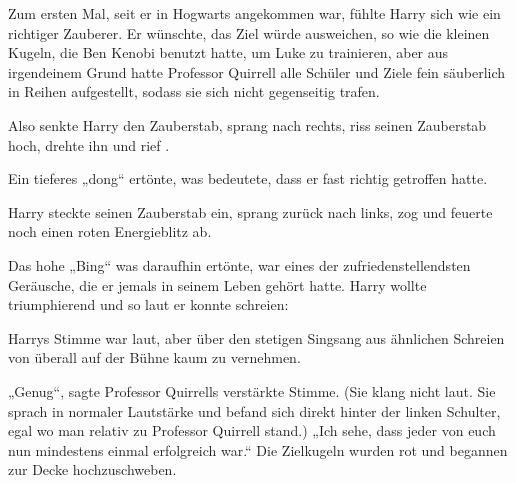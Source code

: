 Zum ersten Mal, seit er in Hogwarts angekommen war, fühlte Harry sich wie ein richtiger Zauberer. Er wünschte, das Ziel würde ausweichen, so wie die kleinen Kugeln, die Ben Kenobi benutzt hatte, um Luke zu trainieren, aber aus irgendeinem Grund hatte Professor Quirrell alle Schüler und Ziele fein säuberlich in Reihen aufgestellt, sodass sie sich nicht gegenseitig trafen.

Also senkte Harry den Zauberstab, sprang nach rechts, riss seinen Zauberstab hoch, drehte ihn und rief .

Ein tieferes „dong“ ertönte, was bedeutete, dass er fast richtig getroffen hatte.

Harry steckte seinen Zauberstab ein, sprang zurück nach links, zog und feuerte noch einen roten Energieblitz ab.

Das hohe
„Bing“ was daraufhin ertönte, war eines der zufriedenstellendsten Geräusche, die er jemals in seinem Leben gehört hatte. Harry wollte triumphierend und so laut er konnte schreien: \emph{}

 Harrys Stimme war laut, aber über den stetigen Singsang aus ähnlichen Schreien von überall auf der Bühne kaum zu vernehmen.

„Genug“, sagte Professor Quirrells verstärkte Stimme. (Sie klang nicht laut. Sie sprach in normaler Lautstärke und befand sich direkt hinter der linken Schulter, egal wo man relativ zu Professor Quirrell stand.)
„Ich sehe, dass jeder von euch nun mindestens einmal erfolgreich war.“ Die Zielkugeln wurden rot und begannen zur Decke hochzuschweben.

